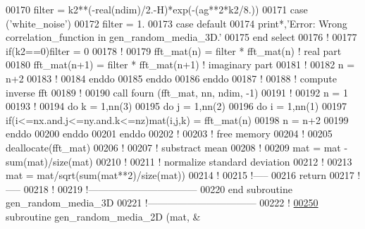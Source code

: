 \begin{DoxyCode}
00170                 filter = k2**(-\textcolor{keywordtype}{real}(ndim)/2.-H)*exp(-(ag**2*k2/8.))
00171              \textcolor{keyword}{case} (\textcolor{stringliteral}{'white\_noise'}) 
00172                 filter = 1.
00173              \textcolor{keyword}{case} default
00174                 print*,\textcolor{stringliteral}{'Error: Wrong correlation\_function in
       gen\_random\_media\_3D.'}
00175              \textcolor{keyword}{end select}
00176              \textcolor{comment}{!}
00177              \textcolor{keyword}{if}(k2==0)filter = 0
00178              \textcolor{comment}{!}
00179              fft\_mat(n)   = filter * fft\_mat(n)   \textcolor{comment}{! real part}
00180              fft\_mat(n+1) = filter * fft\_mat(n+1) \textcolor{comment}{! imaginary part}
00181              \textcolor{comment}{!}
00182              n = n+2
00183              \textcolor{comment}{!}
00184           \textcolor{keyword}{enddo}
00185        \textcolor{keyword}{enddo}
00186     \textcolor{keyword}{enddo}
00187     \textcolor{comment}{!}
00188     \textcolor{comment}{! compute inverse fft}
00189     \textcolor{comment}{!}
00190     call fourn (fft\_mat, nn, ndim, -1)
00191     \textcolor{comment}{!}
00192     n = 1
00193     \textcolor{comment}{!}
00194     \textcolor{keyword}{do} k = 1,nn(3)
00195        \textcolor{keyword}{do} j = 1,nn(2)
00196           \textcolor{keyword}{do} i = 1,nn(1)
00197              \textcolor{keyword}{if}(i<=nx.and.j<=ny.and.k<=nz)mat(i,j,k) = fft\_mat(n)
00198              n = n+2
00199           \textcolor{keyword}{enddo}
00200        \textcolor{keyword}{enddo}
00201     \textcolor{keyword}{enddo}
00202     \textcolor{comment}{!}
00203     \textcolor{comment}{! free memory}
00204     \textcolor{comment}{!}
00205     \textcolor{keyword}{deallocate}(fft\_mat)
00206     \textcolor{comment}{!}
00207     \textcolor{comment}{! substract mean}
00208     \textcolor{comment}{!}
00209     mat = mat - sum(mat)/\textcolor{keyword}{size}(mat)
00210     \textcolor{comment}{!}
00211     \textcolor{comment}{! normalize standard deviation}
00212     \textcolor{comment}{!}
00213     mat = mat/sqrt(sum(mat**2)/\textcolor{keyword}{size}(mat))
00214     \textcolor{comment}{!}
00215     \textcolor{comment}{!-----}
00216     return
00217     \textcolor{comment}{!-----}
00218     \textcolor{comment}{!}
00219   \textcolor{comment}{!---------------------------------}
00220 \textcolor{keyword}{  end subroutine gen\_random\_media\_3D}
00221   \textcolor{comment}{!---------------------------------}
00222   \textcolor{comment}{!}
\hypertarget{module__random__media_8f90_source_l00250}{}\hyperlink{classmodule__random__media_aa23f1e2861b1a505d3d7545e54337bab}{00250}   \textcolor{keyword}{subroutine }gen\_random\_media\_2D (mat,                & 

\end{DoxyCode}
